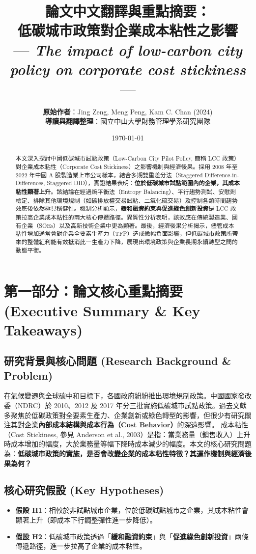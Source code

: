 \documentclass[11pt,a4paper]{article}
\title{\textbf{論文中文翻譯與重點摘要：\\低碳城市政策對企業成本粘性之影響}\\
\large --- \textit{The impact of low-carbon city policy on corporate cost stickiness} ---}
\author{\textbf{原始作者}：Jing Zeng, Meng Peng, Kam C. Chan (2024)\\
\textbf{導讀與翻譯整理}：國立中山大學財務管理學系研究團隊}
\date{\today}
\begin{document}
\maketitle

\begin{abstract}
本文深入探討中國低碳城市試點政策（Low-Carbon City Pilot Policy, 簡稱 LCC 政策）對企業成本粘性（Corporate Cost Stickiness）之影響機制與經濟後果。採用 2008 年至 2022 年中國 A 股製造業上市公司樣本，結合多期雙重差分法（Staggered Difference-in-Differences, Staggered DID），實證結果表明：\textbf{位於低碳城市試點範圍內的企業，其成本粘性顯著上升}。該結論在經過熵平衡法（Entropy Balancing）、平行趨勢測試、安慰劑檢定、排除其他環境規制（如碳排放權交易試點、二氧化硫交易）及控制各類時間趨勢效應後依然極具穩健性。機制分析顯示，\textbf{緩和融資約束}與\textbf{促進綠色創新投資}是 LCC 政策拉高企業成本粘性的兩大核心傳遞路徑。異質性分析表明，該效應在傳統製造業、國有企業（SOEs）以及高新技術企業中更為顯著。最後，經濟後果分析揭示，儘管成本粘性增加通常會對企業全要素生產力（TFP）造成微幅負面影響，但低碳城市政策所帶來的整體紅利能有效抵消此一生產力下降，展現出環境政策與企業長期永續轉型之間的動態平衡。
\end{abstract}

\tableofcontents
\newpage

\section{第一部分：論文核心重點摘要 (Executive Summary \& Key Takeaways)}

\subsection{研究背景與核心問題 (Research Background \& Problem)}
在氣候變遷與全球碳中和目標下，各國政府紛紛推出環境規制政策。中國國家發改委（NDRC）於 2010、2012 及 2017 年分三批實施低碳城市試點政策。過去文獻多聚焦於低碳政策對全要素生產力、企業創新或綠色轉型的影響，但很少有研究關注其對企業\textbf{內部成本結構與成本行為（Cost Behavior）}的深遠影響。
成本粘性（Cost Stickiness, 參見 Anderson et al., 2003）是指：當業務量（銷售收入）上升時成本增加的幅度，大於業務量等幅下降時成本減少的幅度。本文的核心研究問題為：\textbf{低碳城市政策的實施，是否會改變企業的成本粘性特徵？其運作機制與經濟後果為何？}

\subsection{核心研究假設 (Key Hypotheses)}
\begin{itemize}[leftmargin=2em]
    \item \textbf{假設 H1}：相較於非試點城市企業，位於低碳試點城市之企業，其成本粘性會顯著上升（即成本下行調整彈性進一步降低）。
    \item \textbf{假設 H2}：低碳城市政策透過「\textbf{緩和融資約束}」與「\textbf{促進綠色創新投資}」兩條傳遞路徑，進一步拉高了企業的成本粘性。
\end{itemize}
\end{document}
